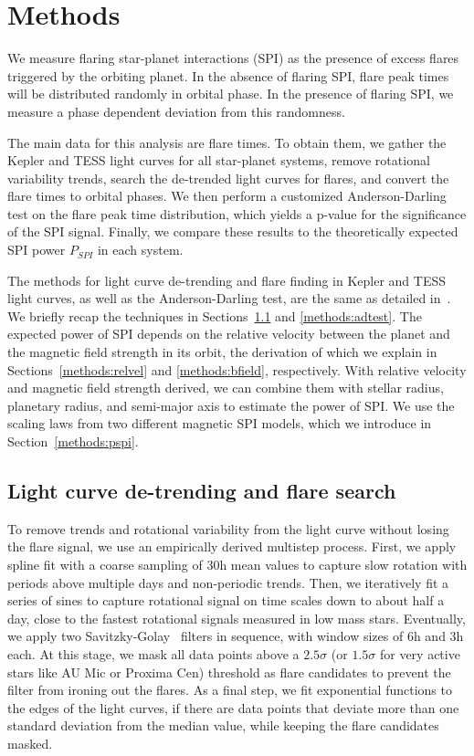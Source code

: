 \documentclass[twocolumn]{aastex631}
\begin{document}
\section{Methods}
\label{sec:methods}
We measure flaring star-planet interactions (SPI) as the presence of excess flares triggered by the orbiting planet. In the absence of flaring SPI, flare peak times will be distributed randomly in orbital phase. In the presence of flaring SPI, we measure a phase dependent deviation from this randomness.

The main data for this analysis are flare times. To obtain them, we gather the Kepler and TESS light curves for all star-planet systems, remove rotational variability trends, search the de-trended light curves for flares, and convert the flare times to orbital phases. We then perform a customized Anderson-Darling test on the flare peak time distribution, which yields a p-value for the significance of the SPI signal. Finally, we compare these results to the theoretically expected SPI power $P_{SPI}$ in each system.

The methods for light curve de-trending and flare finding in Kepler and TESS light curves, as well as the Anderson-Darling test, are the same as detailed in~\citet{ilin2022searching}. We briefly recap the techniques in Sections~\ref{methods:flaresearch} and \ref{methods:adtest}. The expected power of SPI depends on the relative velocity between the planet and the magnetic field strength in its orbit, the derivation of which we explain in 
Sections~\ref{methods:relvel} and \ref{methods:bfield}, respectively. With relative velocity and magnetic field strength derived, we can combine them with stellar radius, planetary radius, and semi-major axis to estimate the power of SPI. We use the scaling laws from two different magnetic SPI models, which we introduce in Section~\ref{methods:pspi}.

\subsection{Light curve de-trending and flare search}
\label{methods:flaresearch}
To remove trends and rotational variability from the light curve without losing the flare signal, we use an empirically derived multistep process. First, we apply spline fit with a coarse sampling of 30h mean values to capture slow rotation with periods above multiple days and non-periodic trends. Then, we iteratively fit a series of sines to capture rotational signal on time scales down to about half a day, close to the fastest rotational signals measured in low mass stars. Eventually, we apply two Savitzky-Golay~\cite{savitzky1964smoothing} filters in sequence, with window sizes of 6h and 3h each. At this stage, we mask all data points above a $2.5 \sigma$ (or $1.5 \sigma$ for very active stars like AU Mic or Proxima Cen) threshold as flare candidates to prevent the filter from ironing out the flares. As a final step, we fit exponential functions to the edges of the light curves, if there are data points that deviate more than one standard deviation from the median value, while keeping the flare candidates masked.
\end{document}
